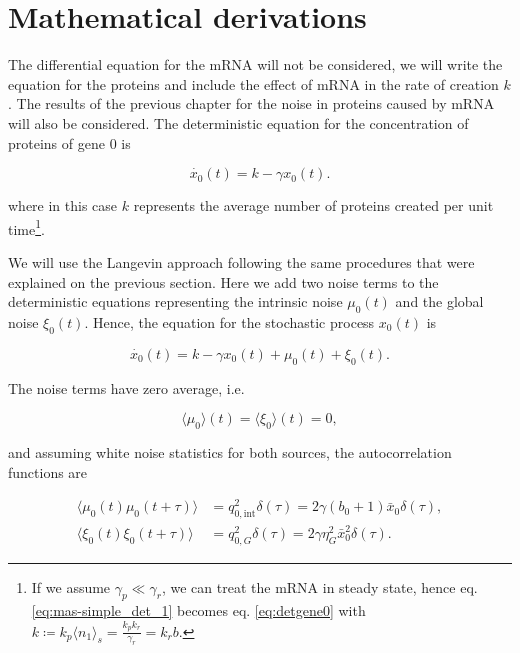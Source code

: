 \section{Mathematical derivations}

The differential equation for the mRNA will not be considered, we will write the equation for the proteins and include the effect of mRNA in the rate of creation $k$. The results of the previous chapter for the noise in proteins caused by mRNA will also be considered. The deterministic equation for the concentration of proteins of gene $0$ is 

\begin{equation}
\label{eq:detgene0}
\dot{x_0}(t) = k - \gamma x_0(t).
\end{equation}

where in this case $k$ represents the average number of proteins created per unit time\footnote{If we assume $\gamma_p\ll\gamma_r$, we can treat the mRNA in steady state, hence eq. \eqref{eq:mas-simple_det_1} becomes eq. \eqref{eq:detgene0} with $k \coloneqq k_p\langle n_1\rangle_s =  \frac{k_pk_r}{\gamma_r} = k_rb$.}.

We will use the Langevin approach following the same procedures that were explained on the previous section. Here we add two noise terms to the deterministic equations representing the intrinsic noise $\mu_0(t)$ and the global noise $\xi_0(t)$. Hence, the equation for the stochastic process $x_0(t)$ is

\begin{equation}
\label{eq:gene0}
\dot{x_0}(t) = k - \gamma x_0(t) + \mu_0(t) + \xi_0(t).
\end{equation}

The noise terms have zero average, i.e.

\begin{equation*}
\langle\mu_0\rangle(t) = \langle\xi_0\rangle(t) = 0,
\end{equation*}

and assuming white noise statistics for both sources, the autocorrelation functions are

\begin{align}
\langle\mu_0(t)\mu_0(t+\tau)\rangle&=q^2_{0,\text{int}}\delta(\tau)=2\gamma(b_0+1)\bar{x}_0\delta(\tau),\label{eq:corin0}\\
\langle\xi_0(t)\xi_0(t+\tau)\rangle&=q^2_{0,G}\delta(\tau)=2\gamma\eta_G^2\bar{x}_0^2\delta(\tau). \label{eq:corex0}
\end{align}

